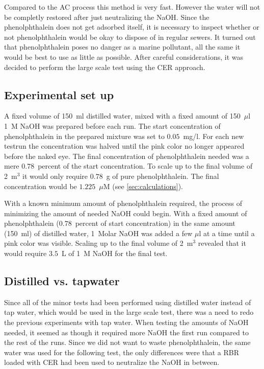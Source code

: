 Compared to the AC process this method is very fast. However the water will not be completly restored after just neutralizing the NaOH. Since the phenolphthalein does not get adsorbed itself, it is necessary to inspect whether or not phenolphthalein would be okay to dispose of in regular sewers. It turned out that phenolphthalein poses no danger as a marine pollutant\cite{url}, all the same it would be best to use as little as possible.
After careful considerations, it was decided to perform the large scale test using the CER approach.

\subsection{Experimental set up}
A fixed volume of 150~ml distilled water, mixed with a fixed amount of 150~$\mu$l 1~M NaOH was prepared before each run. The start concentration of phenolphthalein in the prepared mixture was set to $0.05$~mg/l. For each new testrun the concentration was halved until the pink color no longer appeared before the naked eye. The final concentration of phenolphthalein needed was a mere $0.78$~percent of the start concentration. To scale up to the final volume of 2~m$^3$ it would only require $0.78$~g of pure phenolphthalein. The final concentration would be $1.225$~$\mu$M (see \cref{sec:calculations}).

With a known minimum amount of phenolphthalein required, the process of minimizing the amount of needed NaOH could begin. With a fixed amount of phenolphthalein ($0.78$~percent of start concentration) in the same amount (150~ml) of distilled water, 1~Molar NaOH was added a few $\mu$l at a time until a pink color was visible. Scaling up to the final volume of 2~m$^3$ revealed that it would require $3.5$~L of 1~M NaOH for the final test.

\subsection{Distilled vs. tapwater}
Since all of the minor tests had been performed using distilled water instead of tap water, which would be used in the large scale test, there was a need to redo the previous experiments with tap water. When testing the amounts of NaOH needed, it seemed as though it required more NaOH the first run compared to the rest of the runs. Since we did not want to waste phenolphthalein, the same water was used for the following test, the only differences were that a RBR loaded with CER had been used to neutralize the NaOH in between.

